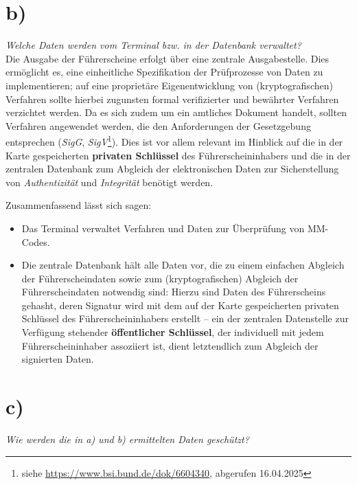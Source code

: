 \section{b)}

\textit{Welche Daten werden vom Terminal bzw. in der Datenbank verwaltet?}\\

\noindent
Die Ausgabe der Führerscheine erfolgt über eine zentrale Ausgabestelle.
Dies ermöglicht es, eine einheitliche Spezifikation der Prüfprozesse von Daten zu implementieren; auf eine proprietäre Eigenentwicklung von (kryptografischen) Verfahren sollte hierbei zugunsten formal verifizierter und bewährter Verfahren verzichtet werden.
Da es sich zudem um ein amtliches Dokument handelt, sollten Verfahren angewendet werden, die den Anforderungen der Gesetzgebung entsprechen (\textit{SigG}, \textit{SigV}\footnote{
    siehe \url{https://www.bsi.bund.de/dok/6604340}, abgerufen 16.04.2025
}).
Dies ist vor allem relevant im Hinblick auf die in der Karte gespeicherten \textbf{privaten Schlüssel} des Führerscheininhabers und die in der zentralen Datenbank zum Abgleich der elektronischen Daten zur Sicherstellung von \textit{Authentizität} und \textit{Integrität} benötigt werden.

Zusammenfassend lässt sich sagen:

\begin{itemize}
    \itemsep0.5em
    \item Das Terminal verwaltet Verfahren und Daten zur Überprüfung von MM-Codes.
    \item Die zentrale Datenbank hält alle Daten vor, die zu einem einfachen Abgleich der Führerscheindaten sowie zum (kryptografischen) Abgleich der Führerscheindaten notwendig sind: Hierzu sind Daten des Führerscheins gehasht, deren Signatur wird mit dem auf der Karte gespeicherten privaten Schlüssel des Führerscheininhabers erstellt – ein der zentralen Datenstelle zur Verfügung stehender \textbf{öffentlicher Schlüssel}, der individuell mit jedem Führerscheininhaber assoziiert ist, dient letztendlich zum Abgleich der signierten Daten.
\end{itemize}

\section{c)}

\textit{Wie werden die in a) und b) ermittelten Daten geschützt?}\\

